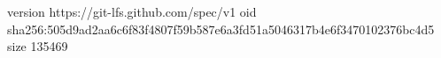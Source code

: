 version https://git-lfs.github.com/spec/v1
oid sha256:505d9ad2aa6c6f83f4807f59b587e6a3fd51a5046317b4e6f3470102376bc4d5
size 135469
